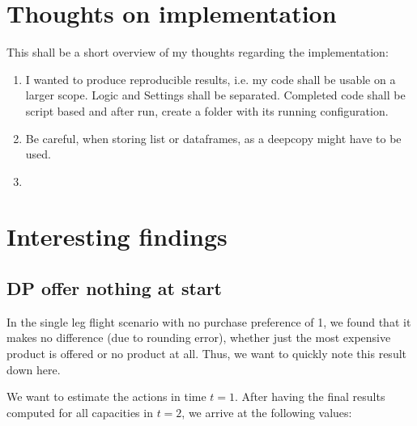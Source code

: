 \chapter{Thoughts on implementation}

This shall be a short overview of my thoughts regarding the implementation:

\begin{enumerate}
	\item I wanted to produce reproducible results, i.e. my code shall be usable on a larger scope. Logic and Settings shall be separated. Completed code shall be script based and after run, create a folder with its running configuration.
	\item Be careful, when storing list or dataframes, as a deepcopy might have to be used.
	\item 
\end{enumerate}

\chapter{Interesting findings}

\section{DP offer nothing at start}

In the single leg flight scenario with no purchase preference of 1, we found that it makes no difference (due to rounding error), whether just the most expensive product is offered or no product at all. Thus, we want to quickly note this result down here. 

We want to estimate the actions in time $t = 1$. After having the final results computed for all capacities in $t=2$, we arrive at the following values:

